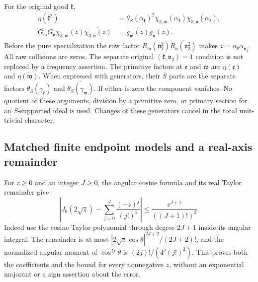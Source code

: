For the original good $\mathfrak k$,
\begin{equation}\label{gtl:frequency-transport}
 \begin{aligned}
 \eta(\mathfrak k^2)
   &=\theta_S(\alpha_{\mathfrak k})^2
        \chi_{3,\mathfrak m}(\alpha_{\mathfrak k})
        \overline{\chi_{3,\mathfrak n}(\alpha_{\mathfrak k})},\\
 \overline{G_{\mathfrak m}}G_{\mathfrak n}
        \chi_{3,\mathfrak m}(z)
        \overline{\chi_{3,\mathfrak n}(z)}
   &=\overline{g_{\mathfrak m}(z)}g_{\mathfrak n}(z).
 \end{aligned}
\end{equation}
Before the pure specialization the row factor
$R_{\mathfrak m}(\mathfrak v_2^2)
 \overline{R_{\mathfrak n}(\mathfrak v_2^2)}$
makes $z=\alpha_{\mathfrak k}\alpha_{\mathfrak v_2}$.
All raw collisions are zeros. The separate original
$(\mathfrak k,\mathfrak v_2)=1$ condition is not replaced by
a frequency assertion.
The primitive factors at $\mathfrak e$ and $\mathfrak w$ are
$\eta(\mathfrak e)$ and $\overline{\eta(\mathfrak w)}$.
When expressed with generators, their $S$ parts are the
separate factors $\theta_S(\gamma_{\mathfrak e})$ and
$\overline{\theta_S(\gamma_{\mathfrak w})}$.
If either is zero the component vanishes. No quotient of
these arguments, division by a primitive zero, or primary
section for an $S$-supported ideal is used. Changes of these
generators cancel in the total unit-trivial character.

\subsection{Matched finite endpoint models and a real-axis remainder}
\label{gtl:models-proof}
For $z\ge0$ and an integer $J\ge0$, the angular cosine formula
and its real Taylor remainder give
\begin{equation}\label{gtl:real-remainder}
 \left|J_0(2\sqrt z)
       -\sum_{j=0}^J\frac{(-z)^j}{(j!)^2}\right|
             \le\frac{z^{J+1}}{((J+1)!)^2}.
\end{equation}
Indeed use the cosine Taylor polynomial through degree
$2J+1$ inside its angular integral. The remainder is at most
$|2\sqrt z\cos\theta|^{2J+2}/(2J+2)!$, and the normalized
angular moment of $\cos^{2j}\theta$ is
$(2j)!/(4^j(j!)^2)$. This proves both the coefficients and
the bound for every nonnegative $z$, without an exponential
majorant or a sign assertion about the error.


